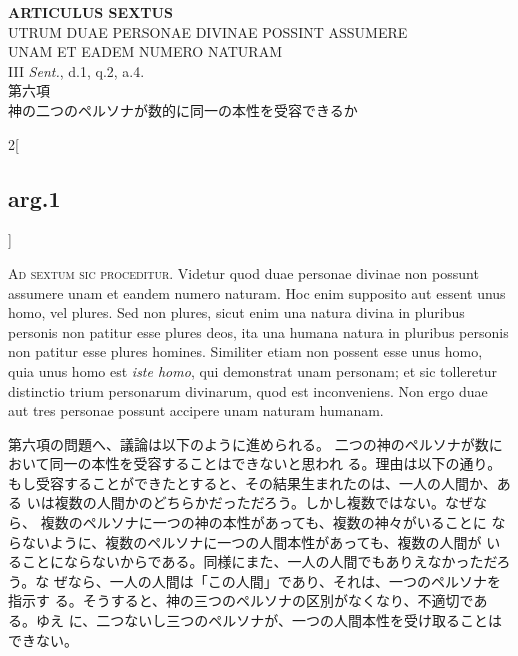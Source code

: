 \documentclass[paper=a4paper,fontsize=10pt,jafontsize=9pt,titlepage]{jlreq}
\begin{document}
\begin{center}
 {\Large {\bfseries ARTICULUS SEXTUS}}\\
 {\large UTRUM DUAE PERSONAE DIVINAE POSSINT ASSUMERE\\UNAM ET EADEM
 NUMERO NATURAM}\\
 {\footnotesize III {\itshape Sent.}, d.1, q.2, a.4.}\\
 {\Large 第六項\\神の二つのペルソナが数的に同一の本性を受容できるか}
\end{center}

\begin{paracol}{2}[\subsection{arg.1}]

{\Huge A}{\scshape d sextum sic proceditur}. Videtur quod duae personae divinae non possunt
assumere unam et eandem numero naturam. Hoc enim supposito aut essent
unus homo, vel plures. Sed non plures, sicut enim una natura divina in
pluribus personis non patitur esse plures deos, ita una humana natura in
pluribus personis non patitur esse plures homines. Similiter etiam non
 possent esse unus homo, quia unus homo est {\itshape iste homo}, qui demonstrat
unam personam; et sic tolleretur distinctio trium personarum divinarum,
quod est inconveniens. Non ergo duae aut tres personae possunt accipere
unam naturam humanam.

\switchcolumn

第六項の問題へ、議論は以下のように進められる。
二つの神のペルソナが数において同一の本性を受容することはできないと思われ
 る。理由は以下の通り。
もし受容することができたとすると、その結果生まれたのは、一人の人間か、ある
 いは複数の人間かのどちらかだっただろう。しかし複数ではない。なぜなら、
 複数のペルソナに一つの神の本性があっても、複数の神々がいることに
 ならないように、複数のペルソナに一つの人間本性があっても、複数の人間が
 いることにならないからである。同様にまた、一人の人間でもありえなかっただろう。な
 ぜなら、一人の人間は「この人間」であり、それは、一つのペルソナを指示す
 る。そうすると、神の三つのペルソナの区別がなくなり、不適切である。ゆえ
 に、二つないし三つのペルソナが、一つの人間本性を受け取ることはできない。



\end{paracol}
\end{document}
